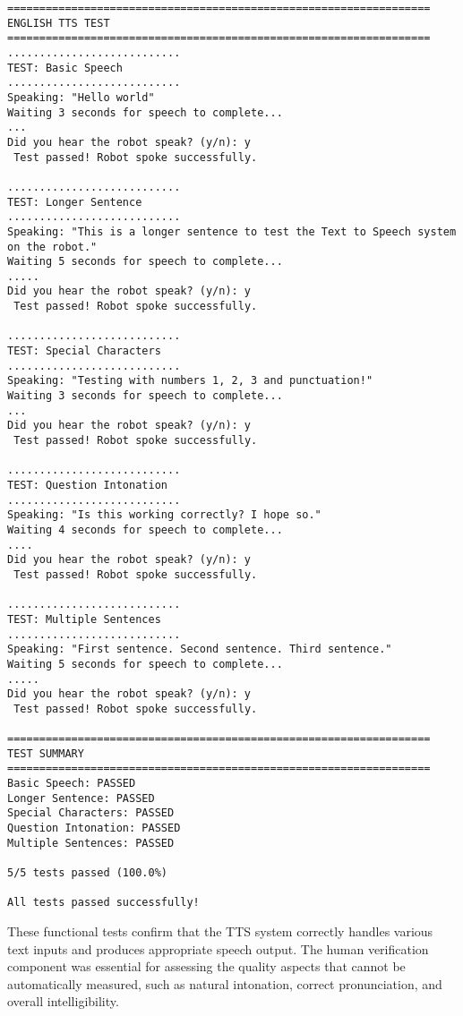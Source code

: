 \documentclass{CSSRforAfrica}
\begin{document}
\begin{lstlisting}[style=commandstyle]
==================================================================
ENGLISH TTS TEST
==================================================================
...........................
TEST: Basic Speech
...........................
Speaking: "Hello world"
Waiting 3 seconds for speech to complete...
...
Did you hear the robot speak? (y/n): y
 Test passed! Robot spoke successfully.

...........................
TEST: Longer Sentence
...........................
Speaking: "This is a longer sentence to test the Text to Speech system on the robot."
Waiting 5 seconds for speech to complete...
.....
Did you hear the robot speak? (y/n): y
 Test passed! Robot spoke successfully.

...........................
TEST: Special Characters
...........................
Speaking: "Testing with numbers 1, 2, 3 and punctuation!"
Waiting 3 seconds for speech to complete...
...
Did you hear the robot speak? (y/n): y
 Test passed! Robot spoke successfully.

...........................
TEST: Question Intonation
...........................
Speaking: "Is this working correctly? I hope so."
Waiting 4 seconds for speech to complete...
....
Did you hear the robot speak? (y/n): y
 Test passed! Robot spoke successfully.

...........................
TEST: Multiple Sentences
...........................
Speaking: "First sentence. Second sentence. Third sentence."
Waiting 5 seconds for speech to complete...
.....
Did you hear the robot speak? (y/n): y
 Test passed! Robot spoke successfully.

==================================================================
TEST SUMMARY
==================================================================
Basic Speech: PASSED
Longer Sentence: PASSED
Special Characters: PASSED
Question Intonation: PASSED
Multiple Sentences: PASSED

5/5 tests passed (100.0%)

All tests passed successfully!
\end{lstlisting}


These functional tests confirm that the TTS system correctly handles various text inputs and produces appropriate speech output. The human verification component was essential for assessing the quality aspects that cannot be automatically measured, such as natural intonation, correct pronunciation, and overall intelligibility.
\end{document}
